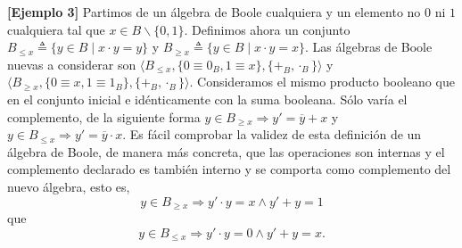   \textbf{{[}Ejemplo 3{]} }Partimos de un álgebra de Boole cualquiera y
  un elemento no $0$ ni $1$ cualquiera tal
  que $x \in B \smallsetminus \{ 0,1 \}.$ Definimos
  ahora un
  conjunto $B_{\leq x} \triangleq \{y \in B \mid x \cdot y = y\}$ y $B_{\geq x} \triangleq \{y \in B \mid x \cdot y = x\}.$
  Las álgebras de Boole nuevas a considerar son
  $\langle B_{\leq x}, \{0 \equiv 0_{B}, 1 \equiv x\}, \{+_{B}, \cdot_{B}\} \rangle$
  y
  $\langle B_{\geq x}, \{0 \equiv x, 1 \equiv 1_{B}\}, \{+_{B}, \cdot_{B}\} \rangle.$
  Consideramos el mismo producto booleano que en el conjunto inicial e
  idénticamente con la suma booleana. Sólo varía el complemento, de la
  siguiente
  forma $y \in B_{\geq x} \Rightarrow y' = \overline{y} + x$ y $y \in B_{\leq x} \Rightarrow y' = \overline{y} \cdot x.$
  Es fácil comprobar la validez de esta definición de un álgebra de
  Boole, de manera más concreta, que las operaciones son internas y el
  complemento declarado es también interno y se comporta como
  complemento del nuevo álgebra, esto
  es,\[{y \in B_{\geq x}}\Rightarrow y{{' \cdot y} = {x \land y}}{{' + y} = 1}\]
  que\[{y \in B_{\leq x}}\Rightarrow y{{' \cdot y} = {0 \land y}}{{' + y} = x} . \]

